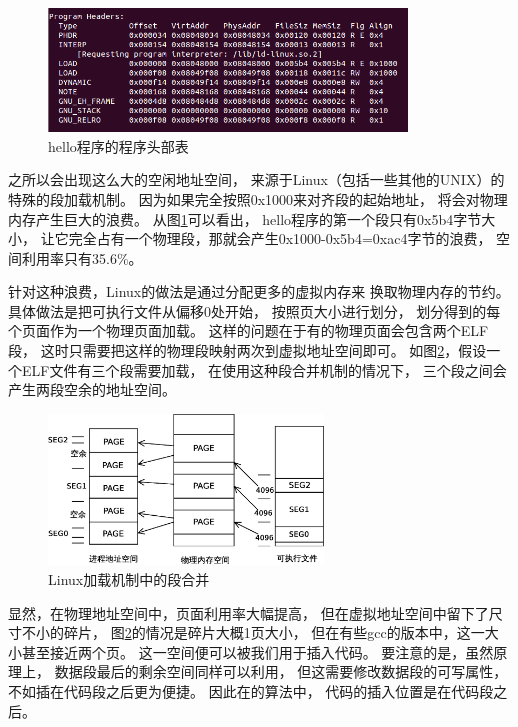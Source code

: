 \begin{figure}[h!]
  \centering
  \includegraphics[width=0.85\textwidth]{figure/helloprograms.png}
  \caption{hello程序的程序头部表}
  \label{hello}
\end{figure}

之所以会出现这么大的空闲地址空间，
来源于Linux（包括一些其他的UNIX）的特殊的段加载机制。
因为如果完全按照0x1000来对齐段的起始地址，
将会对物理内存产生巨大的浪费。
从图\ref{hello}可以看出，
hello程序的第一个段只有0x5b4字节大小，
让它完全占有一个物理段，那就会产生0x1000-0x5b4=0xac4字节的浪费，
空间利用率只有35.6\%。


针对这种浪费，Linux的做法是通过分配更多的虚拟内存来
换取物理内存的节约。
具体做法是把可执行文件从偏移0处开始，
按照页大小进行划分，
划分得到的每个页面作为一个物理页面加载。
这样的问题在于有的物理页面会包含两个ELF段，
这时只需要把这样的物理段映射两次到虚拟地址空间即可。
如图\ref{linuxmap}，假设一个ELF文件有三个段需要加载，
在使用这种段合并机制的情况下，
三个段之间会产生两段空余的地址空间。


\begin{figure}[h!]
  \centering
  \includegraphics[width=0.65\textwidth]{figure/linuxmap.eps}
  \caption{Linux加载机制中的段合并}
  \label{linuxmap}
\end{figure}



显然，在物理地址空间中，页面利用率大幅提高，
但在虚拟地址空间中留下了尺寸不小的碎片，
图\ref{linuxmap}的情况是碎片大概1页大小，
但在有些gcc的版本中，这一大小甚至接近两个页。
这一空间便可以被我们用于插入代码。
要注意的是，虽然原理上，
数据段最后的剩余空间同样可以利用，
但这需要修改数据段的可写属性，
不如插在代码段之后更为便捷。
因此在\cite{silvio}的算法中，
代码的插入位置是在代码段之后。

